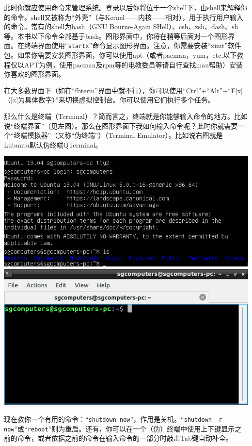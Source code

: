 此时你就应使用命令来管理系统。登录以后你将位于一个shell下，由shell来解释你的命令。shell又被称为“外壳”（与Kernel——内核——相对），用于执行用户输入的命令。常有的shell为bash（GNU Bourne-Again SHell）、csh、zsh、dash、sh等。本书以下命令全部基于bash。图形界面中，你将在稍等后面对一个图形界面。在终端界面使用“\verb|startx|”命令显示图形界面。注意，你需要安装“xinit”软件包。如果你需要安装图形界面，你可以使用apt（或者pacman，yum，etc.以下教程仅以APT为例，使用pacman及rpm等的电教委员等请自行查找man帮助）安装你喜欢的图形界面。\par
在大多数界面下（如在“fbterm”界面中就不行），你可以使用“Ctrl”+“Alt”+“F[x]（[x]为具体数字）”来切换虚拟控制台。你可以使用它们执行多个任务。\par
那么什么是终端（Terminal）？简而言之，终端就是你能够输入命令的地方。比如说“终端界面”（见左图）。那么在图形界面下我如何输入命令呢？此时你就需要一个“终端模拟器”（又称“伪终端”）（Terminal Emulator）。比如说右图就是Lubuntu默认伪终端QTerminal。
\begin{center}
	\includegraphics[scale=0.9]{pic/term1} \includegraphics[scale=0.9]{pic/term2}
\end{center} \par
现在教你一个有用的命令：“\verb|shutdown now|”，作用是关机。“\verb|shutdown -r now|”或“\verb|reboot|”则为重启。还有，你可以在一个（伪）终端中使用上下键显示之前的命令，或者依据之前的命令在输入命令的一部分时敲击Tab键自动补全。
